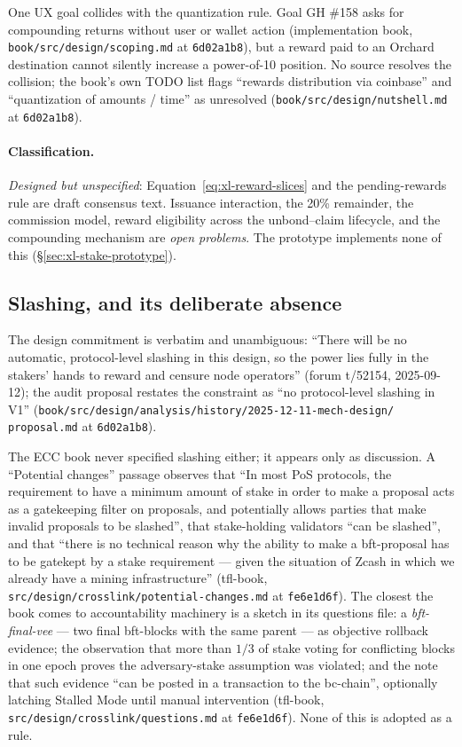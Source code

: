 \documentclass[11pt,a4paper]{article}
\theoremstyle{definition}
\begin{document}
One UX goal collides with the quantization rule. Goal GH \#158 asks for
compounding returns without user or wallet action (implementation book,
\texttt{book/src/design/scoping.md} at \texttt{6d02a1b8}), but a reward
paid to an Orchard destination cannot silently increase a power-of-10
position. No source resolves the collision; the book's own TODO list
flags ``rewards distribution via coinbase'' and ``quantization of amounts
/ time'' as unresolved (\texttt{book/src/design/nutshell.md} at
\texttt{6d02a1b8}).

\paragraph{Classification.} \emph{Designed but unspecified}:
Equation~\eqref{eq:xl-reward-slices} and the pending-rewards rule are
draft consensus text. Issuance interaction, the 20\% remainder, the
commission model, reward eligibility across the unbond--claim lifecycle,
and the compounding mechanism are \emph{open problems}. The prototype
implements none of this (\S\ref{sec:xl-stake-prototype}).

\subsection{Slashing, and its deliberate absence}
\label{sec:xl-stake-slashing}

The design commitment is verbatim and unambiguous: ``There will be no
automatic, protocol-level slashing in this design, so the power lies
fully in the stakers' hands to reward and censure node operators''
(forum t/52154, 2025-09-12); the audit proposal restates the constraint
as ``no protocol-level slashing in V1''
(\texttt{book/src/design/analysis/history/2025-12-11-mech-design/}
\texttt{proposal.md} at \texttt{6d02a1b8}).

The ECC book never specified slashing either; it appears only as
discussion. A ``Potential changes'' passage observes that ``In most PoS
protocols, the requirement to have a minimum amount of stake in order to
make a proposal acts as a gatekeeping filter on proposals, and
potentially allows parties that make invalid proposals to be slashed'',
that stake-holding validators ``can be slashed'', and that ``there is no
technical reason why the ability to make a bft-proposal has to be
gatekept by a stake requirement --- given the situation of Zcash in which
we already have a mining infrastructure'' (tfl-book,
\texttt{src/design/crosslink/potential-changes.md} at \texttt{fe6e1d6f}).
The closest the book comes to accountability machinery is a sketch in its
questions file: a \emph{bft-final-vee} --- two final bft-blocks with the
same parent --- as objective rollback evidence; the observation that more
than $1/3$ of stake voting for conflicting blocks in one epoch proves the
adversary-stake assumption was violated; and the note that such evidence
``can be posted in a transaction to the bc-chain'', optionally latching
Stalled Mode until manual intervention (tfl-book,
\texttt{src/design/crosslink/questions.md} at \texttt{fe6e1d6f}). None of
this is adopted as a rule.
\end{document}

